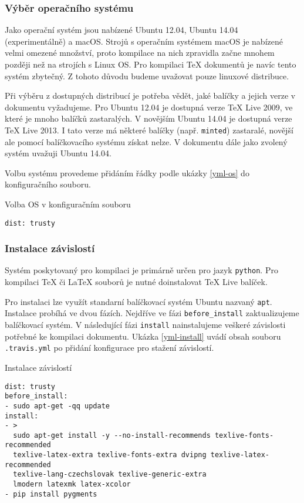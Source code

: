 \documentclass[a4paper]{article}
\begin{document}
\subsubsection*{Výběr operačního systému}

Jako operační systém jsou nabízené Ubuntu 12.04, Ubuntu 14.04 (experimentálně) a macOS.
Strojů s operačním systémem macOS je nabízené velmi omezené množství, proto kompilace na nich zpravidla začne mnohem později než na strojích s Linux OS.
Pro kompilaci \TeX{} dokumentů je navíc tento systém zbytečný.
Z tohoto důvodu budeme uvažovat pouze linuxové distribuce.

Při výběru z dostupných distribucí je potřeba vědět, jaké balíčky a jejich verze v dokumentu vyžadujeme.
Pro Ubuntu 12.04 je dostupná verze \TeX{} Live 2009, ve které je mnoho balíčků zastaralých.
V novějším Ubuntu 14.04 je dostupná verze \TeX{} Live 2013.
I tato verze má některé balíčky (např. \texttt{minted}) zastaralé, novější ale pomocí balíčkovacího systému získat nelze.
V dokumentu dále jako zvolený systém uvažuji Ubuntu 14.04.

Volbu systému provedeme přidáním řádky podle ukázky \ref{yml-os} do konfiguračního souboru.

\begin{listing}[htbp]
\caption{\label{yml-os} Volba OS v konfiguračním souboru}
\begin{verbatim}
dist: trusty
\end{verbatim}
\end{listing}

\subsubsection*{Instalace závislostí}

Systém poskytovaný pro kompilaci je primárně určen pro jazyk \texttt{python}.
Pro kompilaci \TeX{} či \LaTeX{} souborů je nutné doinstalovat \TeX{} Live balíček.

Pro instalaci lze využít standarní balíčkovací systém Ubuntu nazvaný \texttt{apt}.
Instalace probíhá ve dvou fázích.
Nejdříve ve fázi \texttt{before\_install} zaktualizujeme balíčkovací systém.
V následující fázi \texttt{install} nainstalujeme veškeré závislosti potřebné ke kompilaci dokumentu.
Ukázka \ref{yml-install} uvádí obsah souboru \texttt{.travis.yml} po přidání konfigurace pro stažení závislostí.

\begin{listing}[htbp]
\caption{\label{yml-install} Instalace závislostí}
\begin{verbatim}
dist: trusty
before_install:
- sudo apt-get -qq update
install:
- >
  sudo apt-get install -y --no-install-recommends texlive-fonts-recommended
  texlive-latex-extra texlive-fonts-extra dvipng texlive-latex-recommended
  texlive-lang-czechslovak texlive-generic-extra
  lmodern latexmk latex-xcolor
- pip install pygments
\end{verbatim}
\end{listing}
\end{document}
